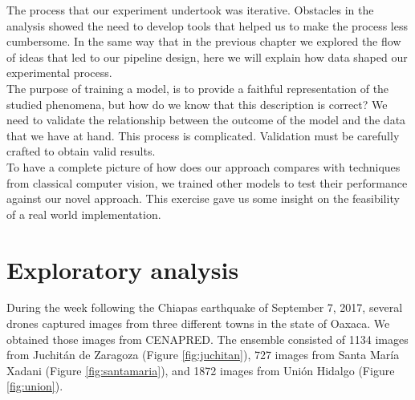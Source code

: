 The process that our experiment undertook was iterative. Obstacles in the analysis showed the need to develop tools that helped us to make the process less cumbersome. In the same way that in the previous chapter we explored the flow of ideas that led to our pipeline design, here we will explain how data shaped our experimental process.\\

The purpose of training a model, is to provide a faithful representation of the  studied phenomena, but how do we know that this description is correct? We need to validate the relationship between the outcome of the model and the data that we have at hand. This process is complicated. Validation must be carefully crafted to obtain valid results.\\

To have a complete picture of how does our approach compares with techniques from classical computer vision, we trained other models to test their performance against our novel approach. This exercise gave us some insight on the feasibility of a real world implementation.\\


\section{Exploratory analysis}

During the week following the Chiapas earthquake of September 7, 2017, several drones captured images from three different towns in the state of Oaxaca. We obtained those images from CENAPRED. The ensemble consisted of 1134 images from Juchit\'an de Zaragoza (Figure \ref{fig:juchitan}), 727 images from Santa Mar\'ia Xadani (Figure \ref{fig:santamaria}), and 1872 images from Uni\'on Hidalgo (Figure \ref{fig:union}).\\

